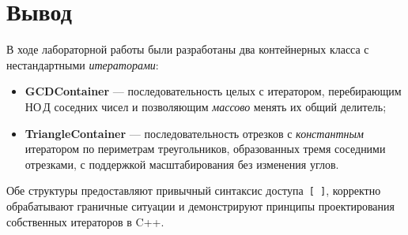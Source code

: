 \documentclass[a4paper, 14pt]{extarticle}
\begin{document}
\section{Вывод}
В ходе лабораторной работы были разработаны два контейнерных класса с
нестандартными \emph{итераторами}:

\begin{itemize}[nosep]
  \item \textbf{GCDContainer} — последовательность целых с итератором,
        перебирающим НО Д соседних чисел и позволяющим
        \emph{массово} менять их общий делитель;
  \item \textbf{TriangleContainer} — последовательность отрезков с
        \emph{константным} итератором по периметрам треугольников,
        образованных тремя соседними отрезками, с поддержкой
        масштабирования без изменения углов.
\end{itemize}

Обе структуры предоставляют привычный синтаксис
доступа~\lstinline|[ ]|, корректно обрабатывают граничные ситуации и
демонстрируют принципы проектирования собственных итераторов в C++.
\end{document}
